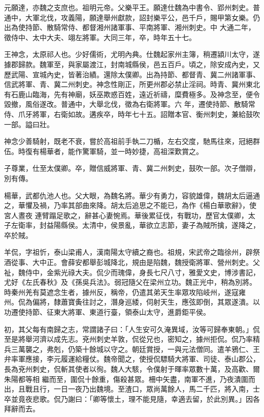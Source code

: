 \begin{pinyinscope}
 元願達，亦魏之支庶也。祖明元帝。父樂平王。願達仕魏為中書令、郢州刺史。普通中，大軍北伐，攻義陽，願達舉州獻款，詔封樂平公，邑千戶，賜甲第女樂。仍出為使持節、散騎常侍、都督湘州諸軍事、平南將軍、湘州刺史。中
 大通二年，徵侍中、太中大夫、翊左將軍。大同三年，卒，時年五十七。



 王神念，太原祁人也。少好儒術，尤明內典。仕魏起家州主簿，稍遷潁川太守，遂據郡歸款。魏軍至，與家屬渡江，封南城縣侯，邑五百戶。頃之，除安成內史，又歷武陽、宣城內史，皆著治績。還除太僕卿。出為持節、都督青、冀二州諸軍事、信武將軍、青、冀二州刺史。神念性剛正，所更州郡必禁止淫祠。時青、冀州東北有石鹿山臨海，先有神廟，妖巫欺惑百姓，遠近祈禱，糜費極多。及神念至，便令毀撤，風俗遂改。普通中，大舉北伐，徵為右衛將軍。六
 年，遷使持節、散騎常侍、爪牙將軍，右衛如故。遘疾卒，時年七十五。詔贈本官、衡州刺史，兼給鼓吹一部。謚曰壯。



 神念少善騎射，既老不衰，嘗於高祖前手執二刀楯，左右交度，馳馬往來，冠絕群伍。時復有楊華者，能作驚軍騎，並一時妙捷，高祖深歎賞之。



 子尊業，仕至太僕卿。卒，贈信威將軍、青、冀二州刺史，鼓吹一部。次子僧辯，別有傳。



 楊華，武都仇池人也。父大眼，為魏名將。華少有勇力，容貌雄偉，魏胡太后逼通之，華懼及禍，乃率其部曲來降。胡太后追思之不能已，為作《楊白華歌辭》，使宮人晝夜
 連臂蹋足歌之，辭甚心妻惋焉。華後累征伐，有戰功，歷官太僕卿，太子左衛率，封益陽縣侯。太清中，侯景亂，華欲立志節，妻子為賊所擒，遂降之，卒於賊。



 羊侃，字祖忻，泰山梁甫人，漢南陽太守續之裔也。祖規，宋武帝之臨徐州，辟祭酒從事、大中正。會薛安都舉彭城降北，規由是陷魏，魏授衛將軍、營州刺史。父祉，魏侍中，金紫光祿大夫。侃少而瑰偉，身長七尺八寸，雅愛文史，博涉書記，尤好《左氏春秋》及《孫吳兵法》。弱冠隨父在梁州立功。魏正光中，稍為別將。時秦州羌有莫遮念生者，據州反，稱帝，仍遣其弟天生率眾攻陷岐州，遂寇雍
 州。侃為偏將，隸蕭寶夤往討之，潛身巡緌，伺射天生，應弦即倒，其眾遂潰。以功遷使持節、征東大將軍、東道行臺，領泰山太守，進爵鉅平侯。



 初，其父每有南歸之志，常謂諸子曰：「人生安可久淹異域，汝等可歸奉東朝。」侃至是將舉河濟以成先志。兗州刺史羊敦，侃從兄也，密知之，據州拒侃。侃乃率精兵三萬襲之，弗剋，仍築十餘城以守之。朝廷賞授，一與元法僧同。遣羊鴉仁、王弁率軍應接，李元履運給糧仗。魏帝聞之，使授侃驃騎大將軍、司徒、泰山郡公，長為兗州刺史，侃斬其使者以徇。魏人大駭，令僕射于暉率眾數十萬，及高歡、爾朱陽都等相
 繼而至，圍侃十餘重，傷殺甚眾。柵中矢盡，南軍不進，乃夜潰圍而出，且戰且行，一日一夜乃出魏境。至渣口，眾尚萬餘人，馬二千匹，將入南，士卒並竟夜悲歌。侃乃謝曰：「卿等懷土，理不能見隨，幸適去留，於此別異。」因各拜辭而去。




\end{pinyinscope}
